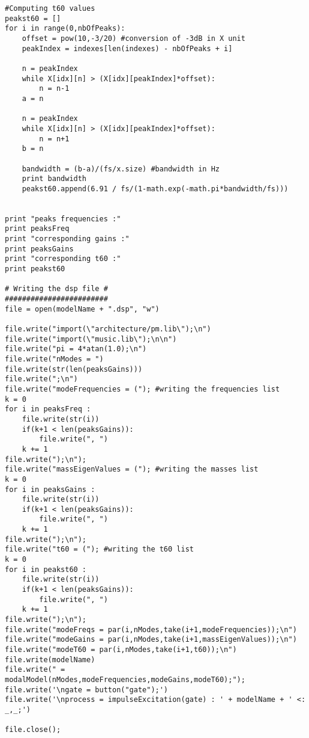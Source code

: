 \begin{lstlisting}
#Computing t60 values
peakst60 = []
for i in range(0,nbOfPeaks):
    offset = pow(10,-3/20) #conversion of -3dB in X unit
    peakIndex = indexes[len(indexes) - nbOfPeaks + i]

    n = peakIndex
    while X[idx][n] > (X[idx][peakIndex]*offset):
        n = n-1
    a = n

    n = peakIndex
    while X[idx][n] > (X[idx][peakIndex]*offset):
        n = n+1
    b = n
    
    bandwidth = (b-a)/(fs/x.size) #bandwidth in Hz
    print bandwidth
    peakst60.append(6.91 / fs/(1-math.exp(-math.pi*bandwidth/fs)))
    

print "peaks frequencies :"
print peaksFreq
print "corresponding gains :"
print peaksGains
print "corresponding t60 :"
print peakst60

# Writing the dsp file #
########################
file = open(modelName + ".dsp", "w")

file.write("import(\"architecture/pm.lib\");\n")
file.write("import(\"music.lib\");\n\n")
file.write("pi = 4*atan(1.0);\n")
file.write("nModes = ")
file.write(str(len(peaksGains)))
file.write(";\n")
file.write("modeFrequencies = ("); #writing the frequencies list
k = 0
for i in peaksFreq :
    file.write(str(i))
    if(k+1 < len(peaksGains)):
        file.write(", ")
    k += 1
file.write(");\n");
file.write("massEigenValues = ("); #writing the masses list
k = 0
for i in peaksGains :
    file.write(str(i))
    if(k+1 < len(peaksGains)):
        file.write(", ")
    k += 1
file.write(");\n");
file.write("t60 = ("); #writing the t60 list
k = 0
for i in peakst60 :
    file.write(str(i))
    if(k+1 < len(peaksGains)):
        file.write(", ")
    k += 1
file.write(");\n");
file.write("modeFreqs = par(i,nModes,take(i+1,modeFrequencies));\n")
file.write("modeGains = par(i,nModes,take(i+1,massEigenValues));\n")
file.write("modeT60 = par(i,nModes,take(i+1,t60));\n")
file.write(modelName)
file.write(" = modalModel(nModes,modeFrequencies,modeGains,modeT60);");
file.write('\ngate = button("gate");')
file.write('\nprocess = impulseExcitation(gate) : ' + modelName + ' <: _,_;')

file.close();

\end{lstlisting}

